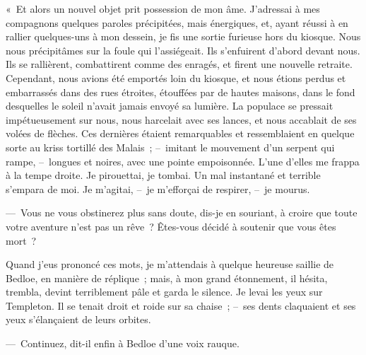 \documentclass[french,twoside]{book} %
\begin{document}
« Et alors un nouvel objet prit possession de mon âme. J’adressai à mes compagnons quelques paroles précipitées, mais énergiques, et, ayant réussi à en rallier quelques-uns à mon dessein, je fis une sortie furieuse hors du kiosque. Nous nous précipitâmes sur la foule qui l’assiégeait. Ils s’enfuirent d’abord devant nous. Ils se rallièrent, combattirent comme des enragés, et firent une nouvelle retraite. Cependant, nous avions été emportés loin du kiosque, et nous étions perdus et embarrassés dans des rues étroites, étouffées par de hautes maisons, dans le fond desquelles le soleil n’avait jamais envoyé sa lumière. La populace se pressait impétueusement sur nous, nous harcelait avec ses lances, et nous accablait de ses volées de flèches. Ces dernières étaient remarquables et ressemblaient en quelque sorte au kriss tortillé des Malais ; – imitant le mouvement d’un serpent qui rampe, – longues et noires, avec une pointe empoisonnée. L’une d’elles me frappa à la tempe droite. Je pirouettai, je tombai. Un mal instantané et terrible s’empara de moi. Je m’agitai, – je m’efforçai de respirer, – je mourus.\par
— Vous ne vous obstinerez plus sans doute, dis-je en souriant, à croire que toute votre aventure n’est pas un rêve ? Êtes-vous décidé à soutenir que vous êtes mort ?\par
Quand j’eus prononcé ces mots, je m’attendais à quelque heureuse saillie de Bedloe, en manière de réplique ; mais, à mon grand étonnement, il hésita, trembla, devint terriblement pâle et garda le silence. Je levai les yeux sur Templeton. Il se tenait droit et roide sur sa chaise ; – ses dents claquaient et ses yeux s’élançaient de leurs orbites.\par
— Continuez, dit-il enfin à Bedloe d’une voix rauque.\par
\end{document}

